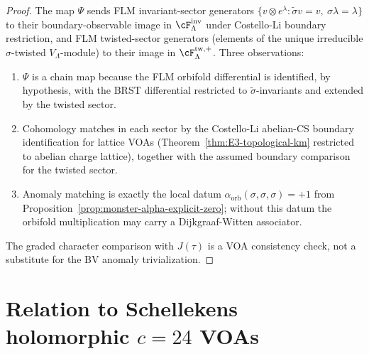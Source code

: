 \begin{proof}
The map $\Psi$ sends FLM invariant-sector generators
$\{v \otimes e^\lambda : \widetilde{\sigma} v = v,\ \sigma\lambda =
\lambda\}$ to their boundary-observable image in
$\cF_\Lambda^{\mathrm{inv}}$ under Costello-Li boundary restriction,
and FLM twisted-sector generators (elements of the unique irreducible
$\sigma$-twisted $V_\Lambda$-module) to their image in
$\cF_\Lambda^{\mathrm{tw},+}$. Three observations:
\begin{enumerate}[label=\textup{(\roman*)}]
\item $\Psi$ is a chain map because the FLM orbifold differential is
identified, by hypothesis, with the BRST differential restricted to
$\widetilde{\sigma}$-invariants and extended by the twisted sector.
\item Cohomology matches in each sector by the Costello-Li
abelian-CS boundary identification for lattice VOAs
(Theorem~\ref*{thm:E3-topological-km} restricted to abelian charge
lattice), together with the assumed boundary comparison for the
twisted sector.
\item Anomaly matching is exactly the local datum
$\alpha_{\mathrm{orb}}(\sigma,\sigma,\sigma)=+1$ from
Proposition~\ref{prop:monster-alpha-explicit-zero}; without this
datum the orbifold multiplication may carry a Dijkgraaf-Witten
associator.
\end{enumerate}
The graded character comparison with $J(\tau)$ is a VOA consistency
check, not a substitute for the BV anomaly trivialization.
\end{proof}

\section{Relation to Schellekens holomorphic $c=24$ VOAs}
\label{sec:monster-schellekens-extension}

